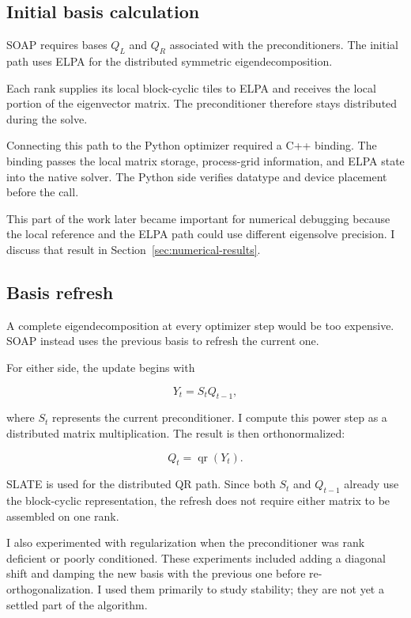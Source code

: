 \documentclass[11pt]{article}
\begin{document}
\subsection{Initial basis calculation}

SOAP requires bases $Q_L$ and $Q_R$ associated with the preconditioners. The initial path uses ELPA for the distributed symmetric eigendecomposition.

Each rank supplies its local block-cyclic tiles to ELPA and receives the local portion of the eigenvector matrix. The preconditioner therefore stays distributed during the solve.

Connecting this path to the Python optimizer required a C++ binding. The binding passes the local matrix storage, process-grid information, and ELPA state into the native solver. The Python side verifies datatype and device placement before the call.

This part of the work later became important for numerical debugging because the local reference and the ELPA path could use different eigensolve precision. I discuss that result in Section~\ref{sec:numerical-results}.

\subsection{Basis refresh}

A complete eigendecomposition at every optimizer step would be too expensive. SOAP instead uses the previous basis to refresh the current one.

For either side, the update begins with

\begin{equation}
Y_t = S_t Q_{t-1},
\end{equation}

where $S_t$ represents the current preconditioner. I compute this power step as a distributed matrix multiplication. The result is then orthonormalized:

\begin{equation}
Q_t = \operatorname{qr}(Y_t).
\end{equation}

SLATE is used for the distributed QR path. Since both $S_t$ and $Q_{t-1}$ already use the block-cyclic representation, the refresh does not require either matrix to be assembled on one rank.

I also experimented with regularization when the preconditioner was rank deficient or poorly conditioned. These experiments included adding a diagonal shift and damping the new basis with the previous one before re-orthogonalization. I used them primarily to study stability; they are not yet a settled part of the algorithm.
\end{document}
